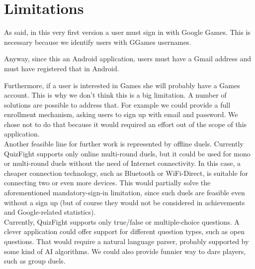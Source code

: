 \section{Limitations}

As said, in this very first version a user must sign in with Google Games.
This is necessary because we identify users with GGames usernames.

Anyway, since this an Android application, users must have a Gmail address and
must have registered that in Android.

Furthermore, if a user is interested in Games she will probably have a Games
account.
This is why we don't think this is a big limitation.
A number of solutions are possible to address that.
For example we could provide a full enrollment mechanism, asking users to sign
up with email and password. We chose not to do that because it would required
an effort out of the scope of this application.  \\

Another feasible line for further work is represented by offline duels.
Currently QuizFight supports only online multi-round duels, but it could be
used for mono or multi-round duels without the need of Internet connectivity.
In this case, a cheaper connection technology, such as Bluetooth or
WiFi-Direct, is suitable for connecting two or even more devices.
This would partially solve the aforementioned mandatory-sign-in limitation,
since such duels are feasible even without a sign up (but of course they would
not be considered in achievements and Google-related statistics). \\

Currently, QuizFight supports only true/false or multiple-choice questions.
A clever application could offer support for different question types, such as
open questions.
That would require a natural language parser, probably supported by some kind of AI
algorithms.
We could also provide funnier way to dare players, such as group duels.
